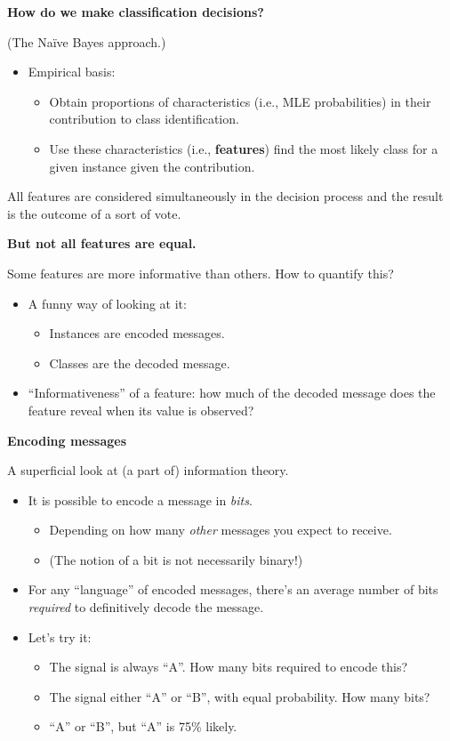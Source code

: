 \documentclass{beamer}
\newcommand{\pagestepalt}[2]{
  \begin{frame}[t]
    \begin{minipage}[t][0.26\textheight][t]{\textwidth}
      \begin{center}
        \huge
        \textbf{#1}
      \end{center}
    \end{minipage}
    
    \begin{minipage}[t][0.7\textheight][c]{\textwidth}
      #2
    \end{minipage}
  \end{frame}
}
\begin{document}
\pagestepalt{How do we make classification decisions?}{
  (The Na\"{i}ve Bayes approach.)
  \begin{itemize}
  \item Empirical basis:
    \begin{itemize}
    \item Obtain proportions of characteristics (i.e., MLE
      probabilities) in their \alert{contribution} to class
      identification.\pause
    \item Use these characteristics (i.e., \textbf{features}) find the
      most likely class for a given instance given the contribution.
    \end{itemize}
  \end{itemize}\pause
  All features are considered \alert{simultaneously} in the decision
  process and the result is the outcome of a sort of vote.
}

\pagestepalt{But not all features are equal.}{
  Some features are more informative than others. How to quantify this?\pause
  \begin{itemize}
  \item A funny way of looking at it:
    \begin{itemize}
    \item Instances are \alert{encoded messages}.
    \item Classes are the decoded message.
    \end{itemize}\pause
  \item ``Informativeness'' of a feature: how much of the decoded
    message does the feature reveal when its value is observed?
  \end{itemize}
}

\pagestepalt{Encoding messages}{
  A superficial look at (a part of) information theory.\pause
  \begin{itemize}
  \item It is possible to encode a message in \textit{bits}.
    \begin{itemize}
    \item Depending on how many {\it other} messages you expect to receive.
    \item (The notion of a bit is \alert{not necessarily binary}!)
    \end{itemize}\pause
  \item For any ``language'' of encoded messages, there's an average number of bits {\it required} to definitively decode the message.\pause
  \item Let's try it:
    \begin{itemize}
    \item The signal is always ``A''. How many bits required to encode this?\pause
    \item The signal either ``A'' or ``B'', with equal probability. How many bits? \pause
    \item ``A'' or ``B'', but ``A'' is 75\% likely.
    \end{itemize}
  \end{itemize}
}
\end{document}
